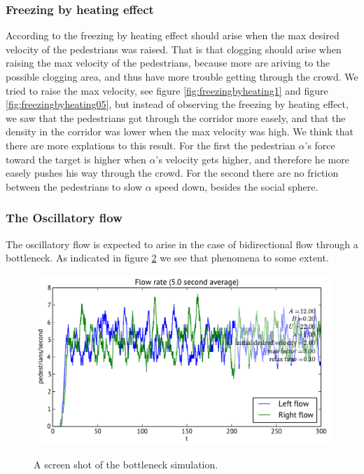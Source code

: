 \begin{figure}[h]
\caption{}
\label{fig:effect-of-widespace}
\end{figure}

\subsubsection{Freezing by heating effect}
According to \cite{self-org} the freezing by heating effect should 
arise when the max desired velocity of the pedestrians was raised.
That is that clogging should arise when raising the max velocity of 
the pedestrians, because more are ariving to the possible clogging area, 
and thus have more trouble getting through the crowd. We tried to raise 
the max velocity, see figure \ref{fig:freezingbyheating1} and figure 
\ref{fig:freezingbyheating05}, but instead of observing the freezing 
by heating effect, we saw that the pedestrians got through the corridor 
more easely, and that the density in the corridor was lower when the 
max velocity was high. We think that there are more explations to this 
result. For the first the pedestrian $\alpha$'s force toward the target
is higher when $\alpha$'s velocity gets higher, and therefore he more 
easely pushes his way through the crowd. For the second there are no 
friction between the pedestrians to slow $\alpha$ speed down, besides 
the social sphere.

\subsubsection{The Oscillatory flow}
The oscillatory flow is expected to arise in the case of bidirectional 
flow through a bottleneck. As indicated in figure \ref{fig:oscillitoryflow} 
we see that phenomena to some extent.

\begin{figure}[h]
\centering
{\includegraphics[scale=0.5]{Figures/bottleneck-flowrate-2.pdf}}
\caption{A screen shot of the bottleneck simulation.}
\label{fig:oscillitoryflow}
\end{figure}

